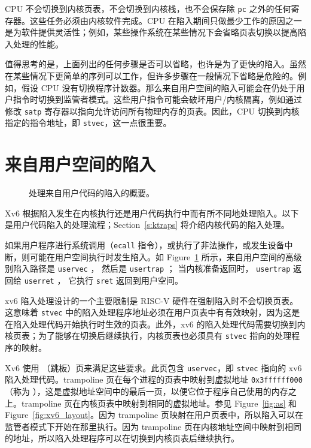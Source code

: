 CPU 不会切换到内核页表，不会切换到内核栈，也不会保存除 {\tt pc} 之外的任何寄存器。这些任务必须由内核软件完成。CPU 在陷入期间只做最少工作的原因之一是为软件提供灵活性；例如，某些操作系统在某些情况下会省略页表切换以提高陷入处理的性能。

值得思考的是，上面列出的任何步骤是否可以省略，也许是为了更快的陷入。虽然在某些情况下更简单的序列可以工作，但许多步骤在一般情况下省略是危险的。例如，假设 CPU 没有切换程序计数器。那么来自用户空间的陷入可能会在仍处于用户指令时切换到监管者模式。这些用户指令可能会破坏用户/内核隔离，例如通过修改 {\tt satp} 寄存器以指向允许访问所有物理内存的页表。因此，CPU 切换到内核指定的指令地址，即 {\tt stvec}，这一点很重要。

\section{来自用户空间的陷入}
\begin{figure}[t]
  \centering
    
\caption{处理来自用户代码的陷入的概要。}
\label{fig:usertrap}
\end{figure}

Xv6 根据陷入发生在内核执行还是用户代码执行中而有所不同地处理陷入。以下是用户代码陷入的处理流程；Section~\ref{s:ktraps} 将介绍内核代码的陷入处理。

如果用户程序进行系统调用（{\tt ecall} 指令），或执行了非法操作，或发生设备中断，则可能在用户空间执行时发生陷入。如 Figure~\ref{fig:usertrap} 所示，来自用户空间的高级别陷入路径是
{\tt uservec}
，
然后是 {\tt usertrap}
；
当内核准备返回时，
{\tt usertrap}
返回给
{\tt userret}
，
它执行 {\tt sret}
返回到用户空间。


xv6 陷入处理设计的一个主要限制是 RISC-V 硬件在强制陷入时不会切换页表。这意味着 {\tt stvec} 中的陷入处理程序地址必须在用户页表中有有效映射，因为这是在陷入处理代码开始执行时生效的页表。此外，xv6 的陷入处理代码需要切换到内核页表；为了能够在切换后继续执行，内核页表也必须具有 {\tt stvec} 指向的处理程序的映射。

Xv6 使用 （跳板）页来满足这些要求。此页包含 {\tt uservec}，即 {\tt stvec} 指向的 xv6 陷入处理代码。trampoline 页在每个进程的页表中映射到虚拟地址 {\tt 0x3ffffff000}（称为 ），这是虚拟地址空间中的最后一页，以便它位于程序自己使用的内存之上。trampoline 页在内核页表中映射到相同的虚拟地址。参见 Figure~\ref{fig:as} 和 Figure~\ref{fig:xv6_layout}。因为 trampoline 页映射在用户页表中，所以陷入可以在监管者模式下开始在那里执行。因为 trampoline 页在内核地址空间中映射到相同的地址，所以陷入处理程序可以在切换到内核页表后继续执行。

